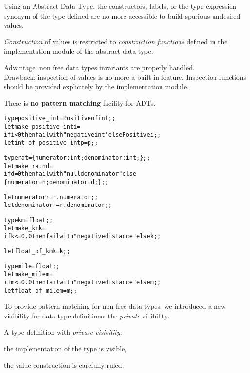 
Using an Abstract Data Type, the constructors, labels, or the type expression
synonym of the type defined are no more accessible to build spurious
undesired values.

{\em Construction} of values is restricted to {\em construction
functions} defined in the implementation module of the abstract data type.

Advantage: non free data types invariants are properly handled.\\
Drawback: inspection of values is no more a built in feature. Inspection
functions should be provided explicitely by the implementation module.

There is {\bf no pattern matching} facility for ADTs.


\begin{alltt}
type positive_int = Positive of int;;
let make_positive_int i =
  if i < 0 then failwith "negative int" else Positive i;;
let int_of_positive_int p = p;;

type rat = \{ numerator : int; denominator : int; \};;
let make_rat n d =
  if d = 0 then failwith "null denominator" else
  \{ numerator = n; denominator = d; \};;

let numerator r = r.numerator;;
let denominator r = r.denominator;;
\end{alltt}


\begin{alltt}
type km = float;;
let make_km k =
  if k <= 0.0 then failwith "negative distance" else k;;

let float_of_km k = k;;

type mile = float;;
let make_mile m =
  if m <= 0.0 then failwith "negative distance" else m;;
let float_of_mile m = m;;
\end{alltt}


To provide pattern matching for non free data types, we introduced a new
visibility for data type definitions: the {\em private} visibility.

A type definition with {\em private visibility}:

\begin{citemize}
\item the implementation of the type is visible,
\item the value construction is carefully ruled.
\end{citemize}

